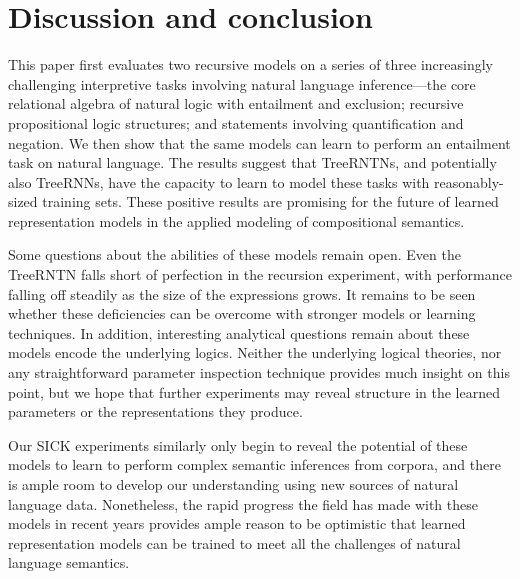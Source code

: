 \section{Discussion and conclusion}\label{sec:discussion}

This paper first evaluates two recursive models on a series of three increasingly
challenging interpretive tasks involving natural language inference---the 
core relational algebra of natural logic with entailment and
exclusion; recursive propositional logic structures; and statements
involving quantification and negation. We then show that the same models can learn to
perform an entailment task on natural language. The results suggest that TreeRNTNs,
and potentially also TreeRNNs, have the capacity to learn to model these tasks with 
reasonably-sized training sets. These positive results are
promising for the future of learned representation models in the
applied modeling of compositional semantics.

Some questions about the abilities of these models remain open. Even
the TreeRNTN falls short of perfection in the recursion experiment, with
performance falling off steadily as the size of the expressions grows. It
remains to be seen whether these deficiencies can be overcome with
stronger models or learning techniques. In addition, interesting 
analytical questions remain about  these models encode
the underlying logics. Neither the underlying
logical theories, nor any straightforward parameter inspection technique provides 
much insight on this point, but we hope that further experiments may reveal 
structure in the learned parameters or the representations they produce.

Our SICK experiments similarly only begin to reveal the potential of these models to learn to 
perform complex semantic inferences from corpora, and there is ample room to develop our understanding
using new sources of natural language data. Nonetheless, the rapid progress the field 
has made with these models in recent years provides ample reason to be optimistic that 
learned representation models can be trained to
meet all the challenges of natural language semantics.

